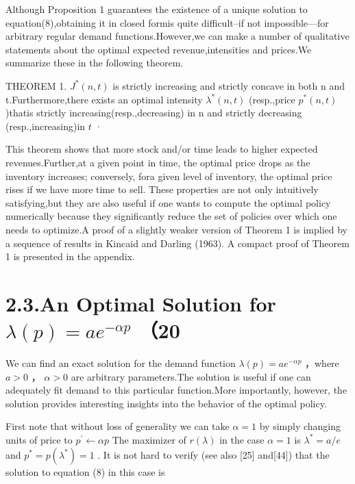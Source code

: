 Although Proposition 1 guarantees the existence of a unique solution to
equation(8),obtaining it in closed formis quite difficult--if not
impossible---for arbitrary regular demand functions.However,we can make
a number of qualitative statements about the optimal expected
revenue,intensities and prices.We summarize these in the following
theorem.

THEOREM 1. \(J ^ { * } ( n , t )\) is strictly increasing and strictly
concave in both n and t.Furthermore,there exists an optimal intensity
\(\lambda ^ { * } ( n , t )\) (resp.,price \(p ^ { * } ( n , t )\)
)thatis strictly increasing(resp.,decreasing) in n and strictly
decreasing (resp.,increasing)in \(t\) ·

This theorem shows that more stock and/or time leads to higher expected
revenues.Further,at a given point in time, the optimal price drops as
the inventory increases; conversely, fora given level of inventory, the
optimal price rises if we have more time to sell. These properties are
not only intuitively satisfying,but they are also useful if one wants to
compute the optimal policy numerically because they significantly reduce
the set of policies over which one needs to optimize.A proof of a
slightly weaker version of Theorem 1 is implied by a sequence of results
in Kincaid and Darling (1963). A compact proof of Theorem 1 is presented
in the appendix.

\section{\texorpdfstring{2.3.An Optimal Solution for
\(\lambda ( p ) = a e ^ { - \alpha p }\)
（20}{2.3.An Optimal Solution for \textbackslash lambda ( p ) = a e \^{} \{ - \textbackslash alpha p \} （20}}\label{an-optimal-solution-for-lambda-p-a-e---alpha-p-20}

We can find an exact solution for the demand function
\(\lambda ( p ) = a e ^ { - \alpha p }\) ，where \(a > 0\) ，
\(\alpha > 0\) are arbitrary parameters.The solution is useful if one
can adequately fit demand to this particular function.More importantly,
however, the solution provides interesting insights into the behavior of
the optimal policy.

First note that without loss of generality we can take \(\alpha = 1\) by
simply changing units of price to \(p ^ { \prime } \gets \alpha p\) The
maximizer of \(r ( \lambda )\) in the case \(\alpha = 1\) is
\(\lambda ^ { * } = a / e\) and
\(p ^ { * } = p ( \lambda ^ { * } ) = 1\) . It is not hard to verify
(see also {[}25{]} and{[}44{]}) that the solution to equation (8) in
this case is

